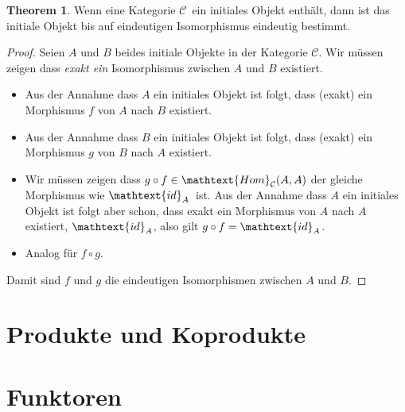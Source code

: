 \documentclass[10pt,twoside,openright]{memoir}
\theoremstyle{definition}
\newtheorem{theorem}{Theorem}
\newcommand{\C}{\ensuremath{\mathcal{C}}}
\newcommand{\Hom}[3]{\ensuremath{\mathtext{Hom}_{#1}(#2, #3)}}
\newcommand{\id}[1]{\ensuremath{\mathtext{id}_{#1}}}
\begin{document}
\begin{theorem}
  Wenn eine Kategorie \C\ ein initiales Objekt enthält, dann ist das initiale Objekt bis auf eindeutigen Isomorphismus eindeutig bestimmt.
\end{theorem}
\begin{proof}
  Seien $A$ und $B$ beides initiale Objekte in der Kategorie \C. Wir müssen zeigen dass \emph{exakt ein} Isomorphismus zwischen $A$ und $B$ existiert.
  \begin{itemize}
  \item Aus der Annahme dass $A$ ein initiales Objekt ist folgt, dass (exakt) ein Morphismus $f$ von $A$ nach $B$ existiert.
  \item Aus der Annahme dass $B$ ein initiales Objekt ist folgt, dass (exakt) ein Morphismus $g$ von $B$ nach $A$ existiert.
  \item Wir müssen zeigen dass $g \circ f \in \Hom{\C}{A}{A}$ der gleiche Morphismus wie \id{A}\ ist. Aus der Annahme dass $A$ ein initiales Objekt ist folgt aber schon, dass exakt ein Morphismus von $A$ nach $A$ existiert, \id{A}, also gilt $g \circ f = \id{A}$.
  \item Analog für $f \circ g$.
  \end{itemize}
  Damit sind $f$ und $g$ die eindeutigen Isomorphismen zwischen $A$ und $B$.
\end{proof}

\section{Produkte und Koprodukte}
\section{Funktoren}
\end{document}
